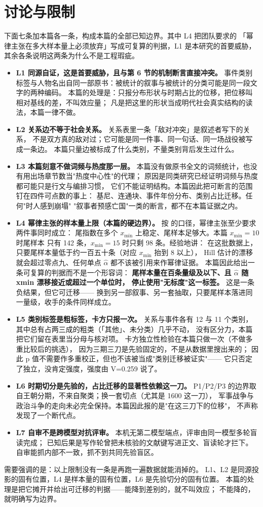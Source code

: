 \section{讨论与限制}

下面七条加本篇各一条，构成本篇的全部已知边界。其中 L4 把团队要求的
「幂律主张在多大样本量上必须放弃」写成可复算的判据，L1 是本研究的首要威胁，
其余各条说明这两条为什么不是工程瑕疵。

\begin{itemize}
\item \textbf{L1 同源自证，这是首要威胁，且与第 6 节的机制断言直接冲突。}
事件类别标签与人物名出自同一部原书：被统计的叙事与被统计的分类可能是同一段文字的两种编码。
本篇的处理是：只报分布形状与时期占比的位移，把位移叫相对基线的差，不叫效应量；
凡是把这里的形状当成明代社会真实结构的读法，本篇一律不做。
\item \textbf{L2 关系边不等于社会关系。} 关系表里一条「敌对冲突」是叙述者写下的关系，
不是双方真的敌对过；它可能是同一件事、同一句话、同一场战役被写成一条边。
本篇只量边被标成了什么类别，不量类别背后发生过什么。
\item \textbf{L3 本篇刻意不做词频与热度那一层。}
本篇没有做原书全文的词频统计，也没有用出场章节数当"热度中心性"的代理；
原因是同类研究已经证明词频与热度都可能只是行文与编排习惯，
它们不能证明结构。本篇因此把可断言的范围钉在四件可点数的事上：
基尼、连通块、事件年份分布、类别占比迁移。任何"时人感到崩塌"
"叙事者预感亡国"一类的断言，都不在本篇证据之内。
\item \textbf{L4 幂律主张的样本量上限（本篇的硬边界）。}
按 \citet{clauset2009} 的口径，幂律主张至少要求两件事同时成立：
尾指数在多个 $x_{\min}$ 上稳定、尾样本足够大。本篇 $x_{\min}=10$ 时尾样本
只有 142 条，$x_{\min}=15$ 时只剩 98 条。经验地讲：
在这批数据上，只要尾样本量低于约一百五十条（对应 $x_{\min}$ 抬到 8 以上），
Hill 估计的漂移就会超过零点九、任何单点 $\hat\alpha$ 都不该被引用来作幂律证据。
本篇因此给出一条可复算的判据而不是一个形容词：
\textbf{尾样本量在百条量级及以下、且 $\hat\alpha$ 随 xmin 漂移接近或超过一个单位时，
停止使用"无标度"这一标签。} 这是一条负结果，但它可迁移——
换到另一部叙事、另一套抽取，只要尾样本落进同一量级，收手的条件同样成立。
\item \textbf{L5 类别标签是粗标签，卡方只报一次。}
关系与事件各有 12 与 11 个类别，其中总有占两三成的粗类（「其他」、未分类）几乎不动，
没有区分力，本篇把它们留在表里当分母与核对项。
卡方独立性检验在本篇只做一次（不做多重比较后的挑选），
因为三期三刀是先验固定的，不是从数据里搜出来的；
因此 p 值不需要作多重校正，但也不该被当成"类别迁移被证实"——
它只否定了独立，没肯定强度，强度由 V=0.259 说了。
\item \textbf{L6 时期切分是先验的，占比迁移的显著性依赖这一刀。}
P1/P2/P3 的边界取自王朝分期，不来自聚类；换一套切点（尤其是 1600 这一刀），
军事战争与政治斗争的走向未必完全保持。本篇因此报的是"在这三刀下的位移"，
不声称发现了一个断代点。
\item \textbf{L7 自审不是跨模型对抗评审。}
本机无第二模型端点，评审由同一模型多轮盲读完成；
已知后果是写作轮曾把未核验的文献键写进正文、盲读轮才拦下。
自审能抓内部不一致，抓不到共同先验盲区。
\end{itemize}

需要强调的是：以上限制没有一条是再跑一遍数据就能消掉的。
L1、L2 是同源投影的固有位置，L4 是样本量的固有位置，L6 是先验切分的固有位置。
本篇的处理是把它摊开并给出可迁移的判据——能降到差别的，就不叫效应；
不能降的，就明确写为边界。
